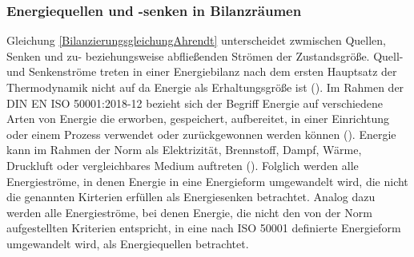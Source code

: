 
\subsubsection{Energiequellen und -senken in Bilanzräumen}
Gleichung \eqref{BilanzierungsgleichungAhrendt} unterscheidet zwmischen Quellen, Senken und zu- beziehungsweise abfließenden Strömen der Zustandsgröße. 
Quell- und Senkenströme treten in einer Energiebilanz nach dem ersten Hauptsatz der Thermodynamik nicht auf da Energie als Erhaltungsgröße ist (\cite[S. 14]{Ahrendts.2014}). 
Im Rahmen der DIN EN ISO 50001:2018-12 bezieht sich der Begriff Energie auf verschiedene Arten von Energie die erworben, gespeichert, aufbereitet, in einer Einrichtung oder einem Prozess verwendet 
oder zurückgewonnen werden können (\cite[Kapitel 3.5.1]{DIN50001.2018}). Energie kann im Rahmen der Norm als Elektrizität, Brennstoff, Dampf, Wärme, Druckluft oder vergleichbares Medium auftreten 
(\cite[Kapitel 3.5.1]{DIN50001.2018}).
Folglich werden alle Energieströme, in denen Energie in eine Energieform umgewandelt wird, die nicht die genannten Kirterien erfüllen als Energiesenken betrachtet. 
Analog dazu werden alle Energieströme, bei denen Energie, die nicht den von der Norm aufgestellten Kriterien entspricht, in eine nach ISO 50001 definierte Energieform 
umgewandelt wird, als Energiequellen betrachtet.





